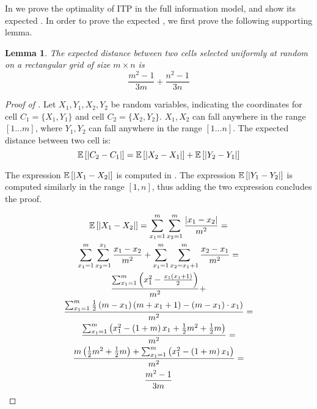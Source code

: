 \documentclass[letterpaper, 10 pt, conference]{ieeeconf}  %
\newtheorem{lemma}[theorem]{Lemma}
\theoremstyle{definition}
\newcommand{\fcc}{{{\sf{FCC}}}\xspace}
\newcommand{\itp}{{{\textsf{ITP}}}\xspace}
\DeclarePairedDelimiter\abs{\lvert}{\rvert}%
\begin{document}
In  we prove the optimality of \itp in the full information model, and show its expected \fcc. %
In order to prove the expected \fcc, we first prove the following supporting lemma.
\begin{lemma}\label{lemmas:ExpectedDistanceTwoCellsRectangular}
The expected distance between two cells selected uniformly at random on a rectangular grid of size $m\times n$ is \[ \frac{m^2-1}{3m}+\frac{n^2-1}{3n}\]
\end{lemma}
\begin{proof}[Proof of ]
Let $X_1,Y_1,X_2,Y_2$ be random variables, indicating the coordinates for cell $C_1=\lbrace X_1, Y_1 \rbrace$ and  cell $C_2=\lbrace X_2, Y_2 \rbrace$. $X_1,X_2$ can fall anywhere in the range $\left[1\ldots m\right]$, where $Y_1,Y_2$ can fall anywhere in the range $\left[1\ldots n\right]$.
The expected distance between two cell is:
\[\mathbb{E}\left[\abs*{C_2-C_1}\right]=\mathbb{E}\left[\abs*{X_2-X_1}\right]+\mathbb{E}\left[\abs*{Y_2-Y_1}\right]\]

The expression $\mathbb{E}\left[\abs*{X_1-X_2}\right]$ is computed in . 
The expression $\mathbb{E}\left[\abs*{Y_1-Y_2}\right]$ is computed similarly in the range $[1,n]$, thus adding the two expression concludes the proof.

\begin{multline}
\mathbb{E}\left[\abs*{X_1-X_2}\right]=
\sum_{x_1=1}^{m}\sum_{x_2=1}^{m}{\frac{\abs*{x_1-x_2}}{m^2}} =\\
\sum_{x_1=1}^{m}\sum_{x_2=1}^{x_1}\frac{x_1-x_2}{m^2}+\sum_{x_1=1}^{m}\sum_{x_2=x_1+1}^{m}\frac{x_2-x_1}{m^2}=\\
\frac{\sum_{x_1=1}^{m}{\left(x_1^2-\frac{x_1\left(x_1+1\right)}{2} \right)}}{m^2}+\\
\frac{\sum_{x_1=1}^{m}\frac{1}{2} \left(m-x_1\right)\left(m+x_1+1)-\left(m-x_1\right)\cdot x_1\right)}{m^2}=\\
\frac{\sum_{x_1=1}^{m}{\left(x_1^2-\left(1+m\right)x_1+\frac{1}{2}m^2+\frac{1}{2}m\right)}}{m^2}=\\
\frac{m\left(\frac{1}{2}m^2+\frac{1}{2}m\right)+\sum_{x_1=1}^{m}{\left(x_1^2-\left(1+m\right)x_1\right)}}{m^2}=\\
\frac{m^2-1}{3m}
\label{equations: 123}    
\end{multline}


\end{proof}
\end{document}

